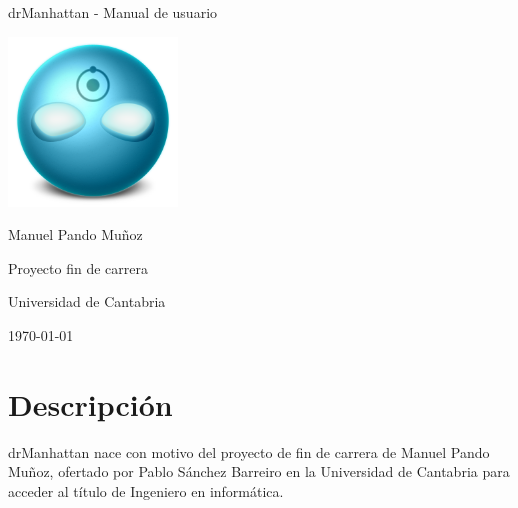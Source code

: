 \documentclass[a4paper,11pt]{article}
\begin{document}

\begin{titlepage}
    \begin{ttfamily}
        \begin{center}
            \vspace*{1in}
            {\LARGE drManhattan - Manual de usuario}
            \par
            \vspace{0.5in}
            \includegraphics[width=4.5cm]{imagenes/portada}

            \vspace{0.5in}
            {\large Manuel Pando Muñoz}
            \par
            Proyecto fin de carrera
            \par
            Universidad de Cantabria
            \par
            \vspace{0.5in}
            \today
        \end{center}
    \end{ttfamily}

    \vfill

    \begin{abstract}
        El siguiente documento representa el manual de usuario para la aplicación drManhattan.
    \end{abstract}
\end{titlepage}



\cleardoublepage

\tableofcontents


\newpage

\section{Descripción}
\label{sec:descripcion}

drManhattan nace con motivo del proyecto de fin de carrera de Manuel Pando Muñoz, ofertado por Pablo Sánchez Barreiro en la Universidad de Cantabria para acceder al título de Ingeniero en informática.
\end{document}
